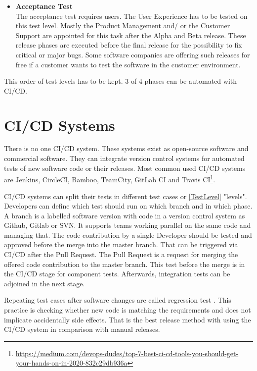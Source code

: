 \begin{itemize}
\item \textbf{Acceptance Test} \\
The acceptance test requires users. The User Experience has to be tested on this test level. Mostly the Product Management and/ or the Customer Support are appointed for this task after the Alpha and Beta release. These release phases are executed before the final release for the possibility to fix critical or major bugs.
Some software companies are offering such releases for free if a customer wants to test the software in the customer environment.
\end{itemize}
This order of test levels has to be kept. 3 of 4 phases can be automated with \gls{CI/CD}. 

\section{CI/CD Systems} \label{CI-CD}

There is no one \gls{CI/CD} system. These systems exist as open-source software and commercial software. They can integrate version control systems for automated tests of new software code or their releases. Most common used \gls{CI/CD} systems are Jenkins, CircleCI, Bamboo, TeamCity, GitLab CI and Travis CI\footnote{\url{https://medium.com/devops-dudes/top-7-best-ci-cd-tools-you-should-get-your-hands-on-in-2020-832c29db936a}}.

\gls{CI/CD} systems can split their tests in different test cases or \ref{TestLevel} "levels". Developers can define which test should run on which branch and in which phase. A branch is a labelled software version with code in a version control system as Github, Gitlab or SVN. It supports teams working parallel on the same code and managing that. The code contribution by a single Developer should be tested and approved before the merge into the master branch. That can be triggered via \gls{CI/CD} after the Pull Request. The Pull Request is a request for merging the offered code contribution to the master branch. This test before the merge is in the \gls{CI/CD} stage for component tests. Afterwards, integration tests can be adjoined in the next stage.

Repeating test cases after software changes are called regression test \cite[~p.98]{Spillner2019}. This practice is checking whether new code is matching the requirements and does not implicate accidentally side effects. That is the best release method with using the \gls{CI/CD} system in comparison with manual releases.

